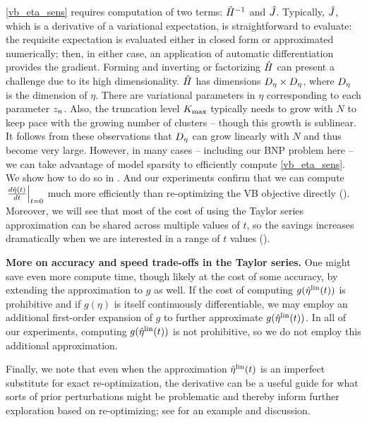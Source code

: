 \eqref{vb_eta_sens} requires computation of two terms: $\hat{H}^{-1}$
and  $\hat J$.  Typically, $\hat J$, which is a derivative of a
variational expectation, is straightforward to evaluate: the requisite expectation is evaluated either
in closed form or approximated numerically; then, in either case, an application of automatic
differentiation provides the gradient. Forming and inverting or
factorizing $\hat{H}$ can present a challenge due to its high dimensionality. $\hat{H}$ has dimensions
${D_{\eta}} \times {D_{\eta}}$, where ${D_{\eta}}$ is the dimension of $\eta$. There are variational parameters in $\eta$ corresponding to each parameter $z_n$. Also, the truncation level ${K_{\mathrm{max}}}$ typically needs to grow with $N$ to keep pace with the growing number of clusters -- though this growth is sublinear. It follows from these observations that ${D_{\eta}}$ can grow linearly with $N$ and thus become very large.  However, in many
cases -- including our BNP problem here -- we can take advantage of model sparsity to
efficiently compute \eqref{vb_eta_sens}. We show how to do so in . And our experiments confirm that we can compute $\left.\frac{d \hat\eta(t)}{d t}\right\vert_{t=0}$ much more efficiently than re-optimizing the VB objective directly (). Moreover, we will see that most of the cost of using the Taylor series approximation can be shared across multiple values of $t$, so the savings increases dramatically when
we are interested in a range of $t$ values ().

\noindent \textbf{More on accuracy and speed trade-offs in the Taylor series.}
One might save even more compute time, though likely at the cost of some accuracy, by extending the approximation to $g$ as well.
If the cost of computing $g(\hat\eta^{\mathrm{lin}}(t))$ is prohibitive and if $g(\eta)$ is itself continuously differentiable, we may employ an additional
first-order expansion of $g$ to further approximate $g(\hat\eta^{\mathrm{lin}}(t))$. In all of our experiments,
computing $g(\hat\eta^{\mathrm{lin}}(t))$ is not prohibitive, so we do not employ this additional approximation.

Finally, we note that even
when the approximation $\hat\eta^{\mathrm{lin}}(t)$ is an imperfect substitute
for exact re-optimization, the derivative can be a useful guide for what sorts
of prior perturbations might be problematic and thereby inform further exploration based
on re-optimizing; see  for an example and discussion.
